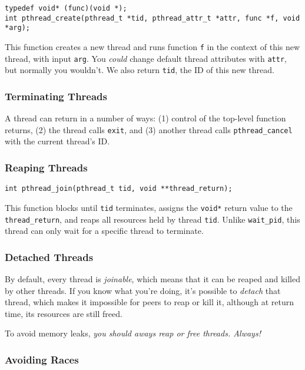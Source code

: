 \documentclass[fleqn]{article}
\begin{document}
\begin{verbatim}
typedef void* (func)(void *);
int pthread_create(pthread_t *tid, pthread_attr_t *attr, func *f, void *arg);
\end{verbatim}

This function creates a new thread and runs function \texttt{f} in the context of this new thread, with input \texttt{arg}. You \textit{could} change default thread attributes with \texttt{attr}, but normally you wouldn't. We also return \texttt{tid}, the ID of this new thread.

\subsubsection{Terminating Threads}

A thread can return in a number of ways: (1) control of the top-level function returns, (2) the thread calls \texttt{exit}, and (3) another thread calls \texttt{pthread\_cancel} with the current thread's ID.

\subsubsection{Reaping Threads}

\begin{verbatim}
int pthread_join(pthread_t tid, void **thread_return);
\end{verbatim}

This function blocks until \texttt{tid} terminates, assigns the \texttt{void*} return value to the \texttt{thread\_return}, and reaps all resources held by thread \texttt{tid}. Unlike \texttt{wait\_pid}, this thread can only wait for a specific thread to terminate.

\subsubsection{Detached Threads}

By default, every thread is \textit{joinable}, which means that it can be reaped and killed by other threads. If you know what you're doing, it's possible to \textit{detach} that thread, which makes it impossible for peers to reap or kill it, although at return time, its resources are still freed.

To avoid memory leaks, \textit{you should aways reap or free threads. Always!}

\subsubsection{Avoiding Races}
\end{document}
